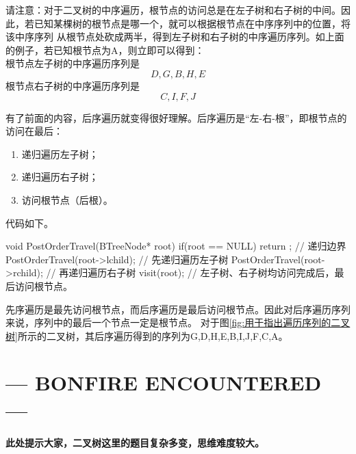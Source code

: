 请注意：对于二叉树的中序遍历，根节点的访问总是在左子树和右子树的中间。因此，若已知某棵树的根节点是哪一个，就可以根据根节点在中序序列中的位置，将该中序序列
从根节点处砍成两半，得到左子树和右子树的中序遍历序列。如上面的例子，若已知根节点为A，则立即可以得到：\\
 根节点左子树的中序遍历序列是
\[
    D, G, B, H, E
\]
 根节点右子树的中序遍历序列是
\[
    C, I, F, J
\]

有了前面的内容，后序遍历就变得很好理解。后序遍历是“左-右-根”，即根节点的访问在最后：
\begin{enumerate}
    \item 递归遍历左子树；
    \item 递归遍历右子树；
    \item 访问根节点（后根）。
\end{enumerate}
代码如下。
\begin{cppcode}
    void PostOrderTravel(BTreeNode* root) {
        if(root == NULL) return ;   // 递归边界
        PostOrderTravel(root->lchild);   // 先递归遍历左子树
        PostOrderTravel(root->rchild);   // 再递归遍历右子树
        visit(root);        // 左子树、右子树均访问完成后，最后访问根节点。
    }
\end{cppcode}
先序遍历是最先访问根节点，而后序遍历是最后访问根节点。因此对后序遍历序列来说，序列中的最后一个节点一定是根节点。
对于图\ref{fig:用于指出遍历序列的二叉树}所示的二叉树，其后序遍历得到的序列为G,D,H,E,B,I,J,F,C,A。\\


\chapter*{--- BONFIRE ENCOUNTERED ---}
{\color{red}\textbf{此处提示大家，二叉树这里的题目复杂多变，思维难度较大。}}

